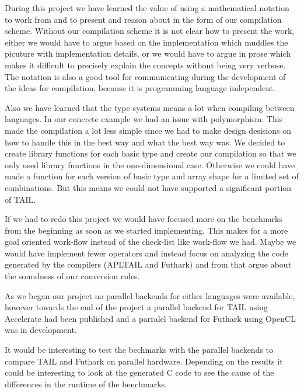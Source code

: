 \documentclass[11pt]{article}
\begin{document}

During this project we have learned the value of using a mathematical notation to work from and to present and reason about in the form of our compilation scheme. 
Without our compilation scheme it is not clear how to present the work, either we would have to argue based on the
implementation which muddles the picuture with implementation details, or we would have to argue in prose which
makes it difficult to precisely explain the concepts without being very verbose.
The notation is also a good tool for communicating during the development of the ideas for compilation, because it is programming language independent.

Also we have learned that the type systems means a lot when compiling between languages. 
In our concrete example we had an issue with polymorphism.
This made the compilation a lot less simple since we had to make design desisions on how to handle this in the best way and what the best way was. 
We decided to create library functions for each basic type and create our compilation so that we only used library functions in the one-dimensional case.
Otherwise we could have made a function for each version of basic type and array shape for a limited set of combinations. But this means we could not have supported a significant portion of TAIL.


If we had to redo this project we would have focused more on the benchnarks from the beginning as soon as we
started implementing. This makes for a more goal oriented work-flow instead of the check-list like work-flow we had.
Maybe we would have implement fewer operators and instead focus on analyzing the code generated by the compilers (APLTAIL and Futhark) and
from that argue about the soundness of our conversion rules.

As we began our project no parallel backends for either languages were available, however towards the end of the project a
parallel backend for TAIL using Accelerate had been published \cite{Array:2015} and a parralel backend for Futhark using OpenCL
was in development.

It would be interesting to test the bechmarks with the parallel backends to compare TAIL and Futhark on parallel hardware.
Depending on the results it could be interesting to look at the generated C code to see the cause of the differences in the
runtime of the benchmarks.
\end{document}
